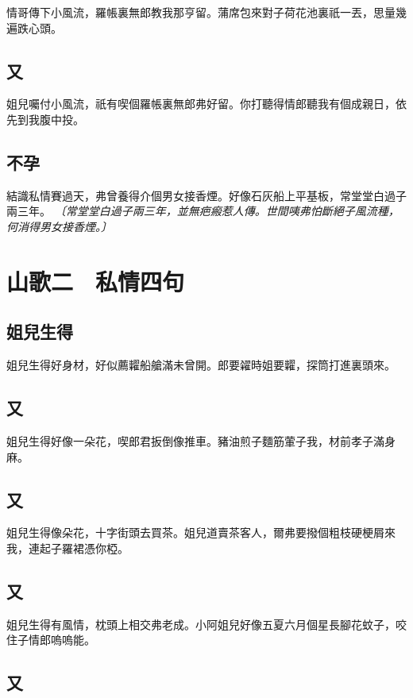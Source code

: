 情哥傳下小風流，羅帳裏無郎教我那亨留。蒲席包來對子荷花池裏祇一丟，思量幾遍跌心頭。

\subsection*{又}

姐兒囑付小風流，祇有喫個羅帳裏無郎弗好留。你打聽得情郎聽我有個成親日，依先到我腹中投。

\subsection*{不孕}

結識私情賽過天，弗曾養得介個男女接香煙。好像石灰船上平基板，常堂堂白過子兩三年。
\textit{〔常堂堂白過子兩三年，並無疤瘢惹人傳。世間咦弗怕斷絕子風流種，何消得男女接香煙。〕}


\section*{山歌二　私情四句}
\subsection*{姐兒生得}

姐兒生得好身材，好似薦糶船艙滿未曾開。郎要糴時姐要糶，探筒打進裏頭來。

\subsection*{又}

姐兒生得好像一朵花，喫郎君扳倒像推車。豬油煎子麵筋葷子我，材前孝子滿身麻。

\subsection*{又}

姐兒生得像朵花，十字街頭去買茶。姐兒道賣茶客人，爾弗要撥個粗枝硬梗屑來我，連起子羅裙憑你椏。

\subsection*{又}

姐兒生得有風情，枕頭上相交弗老成。小阿姐兒好像五夏六月個星長腳花蚊子，咬住子情郎嗚嗚能。

\subsection*{又}

